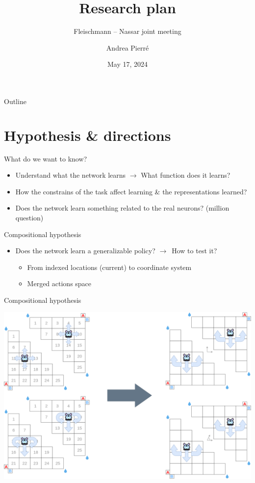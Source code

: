 \documentclass[bigger]{beamer}
\author{Andrea Pierré}
\date{May 17, 2024}
\title{Research plan}
\subtitle{Fleischmann -- Nassar joint meeting}
\institute{Brown University}
\begin{document}
\maketitle
\begin{frame}[plain]{Outline}
\tableofcontents
\end{frame}

\section{Hypothesis \& directions }
\label{sec:org99b0d5c}
\begin{frame}[<+->][label={sec:org0593a3a}]{What do we want to know?}
\begin{itemize}
\item Understand what the network learns
\(\to\) What \alert{function} does it learns?
\item How the constrains of the task affect learning \& the representations learned?
\item Does the network learn something related to the real neurons? (million  question)
\end{itemize}
\end{frame}
\begin{frame}[<+->][label={sec:org1366ba2}]{Compositional hypothesis}
\begin{itemize}
\item Does the network learn a generalizable policy? \(\to\)~How to test it?
\begin{itemize}
\item From indexed locations (current) to coordinate system
\item Merged actions space
\end{itemize}
\end{itemize}
\end{frame}
\begin{frame}[label={sec:orgd0450ed}]{Compositional hypothesis}
\begin{center}
\includegraphics[width=.9\linewidth]{img/env_new-triangle-task.drawio.png}
\end{center}
\end{frame}
\end{document}
